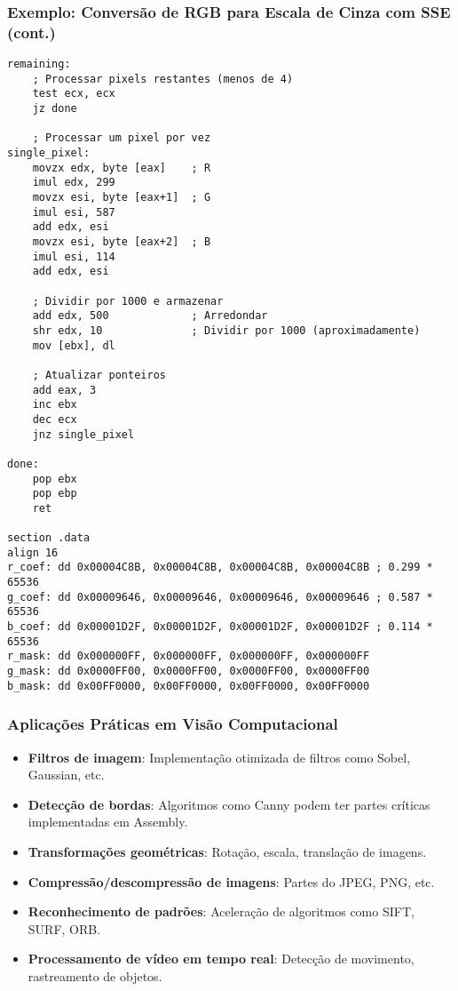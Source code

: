 \documentclass[11pt]{beamer}
\begin{document}
\begin{frame}[fragile]
\frametitle{Exemplo: Conversão de RGB para Escala de Cinza com SSE (cont.)}

\begin{lstlisting}[language={[x86masm]Assembler}, basicstyle=\tiny]    
remaining:
    ; Processar pixels restantes (menos de 4)
    test ecx, ecx
    jz done
    
    ; Processar um pixel por vez
single_pixel:
    movzx edx, byte [eax]    ; R
    imul edx, 299
    movzx esi, byte [eax+1]  ; G
    imul esi, 587
    add edx, esi
    movzx esi, byte [eax+2]  ; B
    imul esi, 114
    add edx, esi
    
    ; Dividir por 1000 e armazenar
    add edx, 500             ; Arredondar
    shr edx, 10              ; Dividir por 1000 (aproximadamente)
    mov [ebx], dl
    
    ; Atualizar ponteiros
    add eax, 3
    inc ebx
    dec ecx
    jnz single_pixel
    
done:
    pop ebx
    pop ebp
    ret

section .data
align 16
r_coef: dd 0x00004C8B, 0x00004C8B, 0x00004C8B, 0x00004C8B ; 0.299 * 65536
g_coef: dd 0x00009646, 0x00009646, 0x00009646, 0x00009646 ; 0.587 * 65536
b_coef: dd 0x00001D2F, 0x00001D2F, 0x00001D2F, 0x00001D2F ; 0.114 * 65536
r_mask: dd 0x000000FF, 0x000000FF, 0x000000FF, 0x000000FF
g_mask: dd 0x0000FF00, 0x0000FF00, 0x0000FF00, 0x0000FF00
b_mask: dd 0x00FF0000, 0x00FF0000, 0x00FF0000, 0x00FF0000
\end{lstlisting}

\end{frame}

\begin{frame}
\frametitle{Aplicações Práticas em Visão Computacional}

\begin{itemize}
    \item \textbf{Filtros de imagem}: Implementação otimizada de filtros como Sobel, Gaussian, etc.
    \item \textbf{Detecção de bordas}: Algoritmos como Canny podem ter partes críticas implementadas em Assembly.
    \item \textbf{Transformações geométricas}: Rotação, escala, translação de imagens.
    \item \textbf{Compressão/descompressão de imagens}: Partes do JPEG, PNG, etc.
    \item \textbf{Reconhecimento de padrões}: Aceleração de algoritmos como SIFT, SURF, ORB.
    \item \textbf{Processamento de vídeo em tempo real}: Detecção de movimento, rastreamento de objetos.
\end{itemize}

\end{frame}
\end{document}
